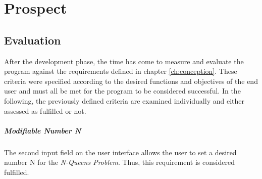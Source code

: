 
\chapter{Prospect}
\label{ch:prospect}

\section{Evaluation}
\label{sec:proEvalutation}
After the development phase, the time has come to measure and evaluate the program against the requirements defined in chapter \ref{ch:conception}. These criteria were specified according to the desired functions and objectives of the end user and must all be met for the program to be considered successful. In the following, the previously defined criteria are examined individually and either assessed as fulfilled or not.

\paragraph{Modifiable Number N}
The second input field on the user interface allows the user to set a desired number N for the \textit{N-Queens Problem}. Thus, this requirement is considered fulfilled.


